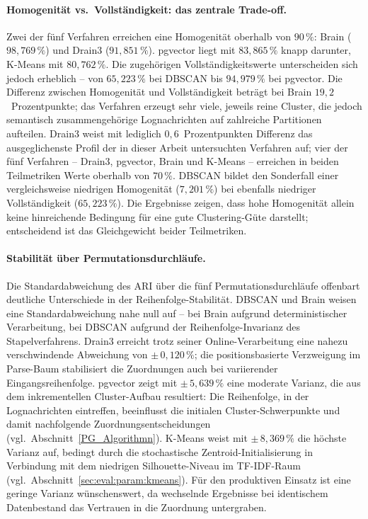 \paragraph{Homogenität vs.\ Vollständigkeit: das zentrale Trade-off.}
Zwei der fünf Verfahren erreichen eine Homogenität oberhalb von $90\,\%$: Brain ($98{,}769\,\%$) und Drain3 ($91{,}851\,\%$). pgvector liegt mit $83{,}865\,\%$ knapp darunter, K-Means mit $80{,}762\,\%$. Die zugehörigen Vollständigkeitswerte unterscheiden sich jedoch erheblich -- von $65{,}223\,\%$ bei DBSCAN bis $94{,}979\,\%$ bei pgvector. Die Differenz zwischen Homogenität und Vollständigkeit beträgt bei Brain $19{,}2$~Prozentpunkte; das Verfahren erzeugt sehr viele, jeweils reine Cluster, die jedoch semantisch zusammengehörige Lognachrichten auf zahlreiche Partitionen aufteilen. Drain3 weist mit lediglich $0{,}6$~Prozentpunkten Differenz das ausgeglichenste Profil der in dieser Arbeit untersuchten Verfahren auf; vier der fünf Verfahren -- Drain3, pgvector, Brain und K-Means -- erreichen in beiden Teilmetriken Werte oberhalb von $70\,\%$. DBSCAN bildet den Sonderfall einer vergleichsweise niedrigen Homogenität ($7{,}201\,\%$) bei ebenfalls niedriger Vollständigkeit ($65{,}223\,\%$). Die Ergebnisse zeigen, dass hohe Homogenität allein keine hinreichende Bedingung für eine gute Clustering-Güte darstellt; entscheidend ist das Gleichgewicht beider Teilmetriken.

\paragraph{Stabilität über Permutationsdurchläufe.}
Die Standardabweichung des ARI über die fünf Permutationsdurchläufe offenbart deutliche Unterschiede in der Reihenfolge-Stabilität. DBSCAN und Brain weisen eine Standardabweichung nahe null auf -- bei Brain aufgrund deterministischer Verarbeitung, bei DBSCAN aufgrund der Reihenfolge-Invarianz des Stapelverfahrens. Drain3 erreicht trotz seiner Online-Verarbeitung eine nahezu verschwindende Abweichung von $\pm\,0{,}120\,\%$; die positionsbasierte Verzweigung im Parse-Baum stabilisiert die Zuordnungen auch bei variierender Eingangsreihenfolge. pgvector zeigt mit $\pm\,5{,}639\,\%$ eine moderate Varianz, die aus dem inkrementellen Cluster-Aufbau resultiert: Die Reihenfolge, in der Lognachrichten eintreffen, beeinflusst die initialen Cluster-Schwerpunkte und damit nachfolgende Zuordnungsentscheidungen (vgl.\ Abschnitt~\ref{PG_Algorithmn}). K-Means weist mit $\pm\,8{,}369\,\%$ die höchste Varianz auf, bedingt durch die stochastische Zentroid-Initialisierung in Verbindung mit dem niedrigen Silhouette-Niveau im TF-IDF-Raum (vgl.\ Abschnitt~\ref{sec:eval:param:kmeans}). Für den produktiven Einsatz ist eine geringe Varianz wünschenswert, da wechselnde Ergebnisse bei identischem Datenbestand das Vertrauen in die Zuordnung untergraben.

